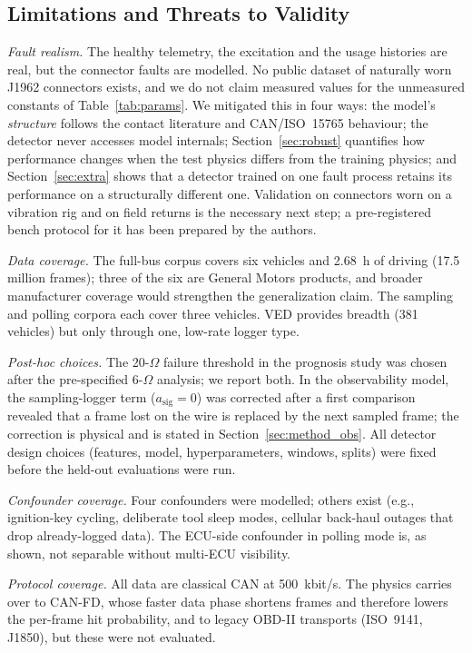 \subsection{Limitations and Threats to Validity}
\emph{Fault realism.} The healthy telemetry, the excitation and the usage
histories are real, but the connector faults are modelled. No public
dataset of naturally worn J1962 connectors exists, and we do not claim
measured values for the unmeasured constants of Table~\ref{tab:params}.
We mitigated this in four ways: the model's \emph{structure} follows the
contact literature and CAN/ISO~15765 behaviour; the detector never accesses
model internals; Section~\ref{sec:robust} quantifies how performance
changes when the test physics differs from the training physics; and
Section~\ref{sec:extra} shows that a detector trained on one fault process
retains its performance on a structurally different one.
Validation on connectors worn on a vibration rig and on field returns is
the necessary next step; a pre-registered bench protocol for it has been
prepared by the authors.

\emph{Data coverage.} The full-bus corpus covers six vehicles and 2.68~h of
driving (17.5 million frames); three of the six are General Motors products,
and broader manufacturer coverage would strengthen the generalization claim.
The sampling and polling corpora each cover three vehicles. VED provides breadth (381
vehicles) but only through one, low-rate logger type.

\emph{Post-hoc choices.} The 20-$\Omega$ failure threshold in the prognosis
study was chosen after the pre-specified 6-$\Omega$ analysis; we report both.
In the observability model, the sampling-logger term ($a_{\mathrm{sig}}=0$)
was corrected after a first comparison revealed that a frame lost on the
wire is replaced by the next sampled frame; the correction is physical and
is stated in Section~\ref{sec:method_obs}. All detector design choices
(features, model, hyperparameters, windows, splits) were fixed before the
held-out evaluations were run.

\emph{Confounder coverage.} Four confounders were modelled; others exist
(e.g., ignition-key cycling, deliberate tool sleep modes, cellular back-haul
outages that drop already-logged data). The ECU-side confounder in
polling mode is, as shown, not separable without multi-ECU visibility.

\emph{Protocol coverage.} All data are classical CAN at 500~kbit/s. The
physics carries over to CAN-FD, whose faster data phase shortens frames
and therefore lowers the per-frame hit probability, and to legacy OBD-II
transports (ISO~9141, J1850), but these were not evaluated.


